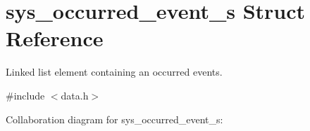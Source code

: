 \hypertarget{structsys__occurred__event__s}{}\section{sys\+\_\+occurred\+\_\+event\+\_\+s Struct Reference}
\label{structsys__occurred__event__s}


Linked list element containing an occurred events.  




{\ttfamily \#include $<$data.\+h$>$}



Collaboration diagram for sys\+\_\+occurred\+\_\+event\+\_\+s\+:
